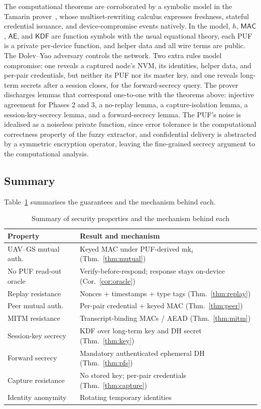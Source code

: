 \documentclass[journal]{IEEEtran}
\begin{document}
The computational theorems are corroborated by a symbolic model in the Tamarin
prover~\cite{tamarin}, whose multiset-rewriting calculus expresses freshness,
stateful credential issuance, and device-compromise events natively. In the
model, $h$, $\mathsf{MAC}$, $\mathsf{AE}$, and $\mathsf{KDF}$ are function
symbols with the usual equational theory, each PUF is a private per-device
function, and helper data and all wire terms are public. The Dolev--Yao
adversary controls the network. Two extra rules model compromise: one reveals a
captured node's NVM, its identities, helper data, and per-pair credentials, but
neither its PUF nor its master key, and one reveals long-term secrets after a
session closes, for the forward-secrecy query. The prover discharges lemmas
that correspond one-to-one with the theorems above: injective agreement for
Phases 2 and 3, a no-replay lemma, a capture-isolation lemma, a
session-key-secrecy lemma, and a forward-secrecy lemma. The PUF's noise is
idealised as a noiseless private function, since error tolerance is the
computational correctness property of the fuzzy extractor, and confidential
delivery is abstracted by a symmetric encryption operator, leaving the
fine-grained secrecy argument to the computational analysis.

\subsection{Summary}

Table~\ref{tab:secsum} summarises the guarantees and the mechanism behind each.

\begin{table}[H]
\centering
\caption{Summary of security properties and the mechanism behind each}
\label{tab:secsum}
\scriptsize
\setlength{\tabcolsep}{2.6pt}
\begin{tabular}{@{}p{3.3cm}p{5.1cm}@{}}
\toprule
\textbf{Property} & \textbf{Result and mechanism} \\
\midrule
UAV--GS mutual auth. & Keyed MAC under PUF-derived $\text{mk}_i$ (Thm.~\ref{thm:mutual}) \\
No PUF read-out oracle & Verify-before-respond; response stays on-device (Cor.~\ref{cor:oracle}) \\
Replay resistance & Nonces $+$ timestamps $+$ type tags (Thm.~\ref{thm:replay}) \\
Peer mutual auth. & Per-pair credential $+$ keyed MAC (Thm.~\ref{thm:peer}) \\
MITM resistance & Transcript-binding MACs / AEAD (Thm.~\ref{thm:mitm}) \\
Session-key secrecy & KDF over long-term key and DH secret (Thm.~\ref{thm:key}) \\
Forward secrecy & Mandatory authenticated ephemeral DH (Thm.~\ref{thm:pfs}) \\
Capture resistance & No stored key; per-pair credentials (Thm.~\ref{thm:capture}) \\
Identity anonymity & Rotating temporary identities \\
\bottomrule
\end{tabular}
\end{table}
\end{document}
